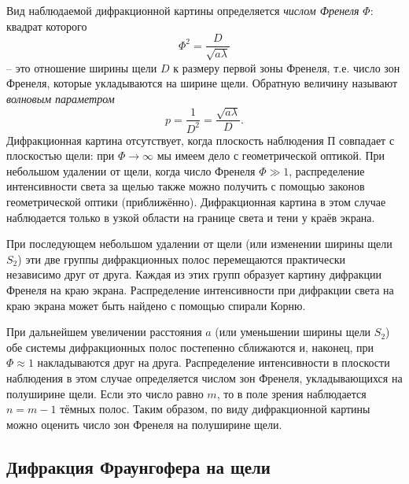 \documentclass[a4paper,12pt]{article}
\begin{document}
Вид наблюдаемой дифракционной картины определяется \textit{числом Френеля} $\Phi$: квадрат которого 
\begin{equation}\label{eq: Fresnel number}
    \Phi^2 = \frac{D}{\sqrt{a\lambda}}
\end{equation}
-- это отношение ширины щели $D$ к размеру первой зоны Френеля, т.е. число зон Френеля, которые укладываются на ширине щели. Обратную величину называют \textit{волновым параметром}
\begin{equation}\label{eq: Wave parameter}
    p = \frac{1}{D^2} = \frac{\sqrt{a\lambda}}{D}.
\end{equation} 
Дифракционная картина отсутствует, когда плоскость наблюдения $П$ совпадает с плоскостью щели: при $\Phi \rightarrow \infty$ мы имеем дело с геометрической оптикой. При небольшом
удалении от щели, когда число Френеля $\Phi \gg 1$, распределение интенсивности света за щелью также можно получить с помощью законов геометрической оптики (приближённо). Дифракционная картина в этом случае наблюдается только в узкой области на границе света и тени у краёв экрана.

При последующем небольшом удалении от щели (или изменении ширины щели $S_2$) эти две группы дифракционных полос перемещаются практически независимо друг от друга. Каждая из этих групп образует картину дифракции Френеля на краю экрана. Распределение интенсивности при дифракции света на краю экрана может быть найдено с помощью спирали Корню.

При дальнейшем увеличении расстояния $a$ (или уменьшении ширины щели $S_2$) обе системы дифракционных полос постепенно сближаются и, наконец, при $\Phi \approx 1$ накладываются друг на друга. Распределение интенсивности в плоскости наблюдения в этом случае определяется числом зон Френеля, укладывающихся на полуширине щели. Если это число равно $m$, то в поле зрения наблюдается $n = m - 1$ тёмных полос. Таким образом, по виду дифракционной картины можно оценить число зон Френеля на полуширине щели.

\subsection{Дифракция Фраунгофера на щели}
\end{document}
